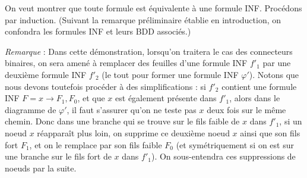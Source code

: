 \documentclass[a4paper,11pt]{article}
\begin{document}
		
		
		On veut montrer que toute formule est équivalente à une formule INF.
		Procédons par induction.
		(Suivant la remarque préliminaire établie en introduction, on confondra les formules INF et leurs BDD associés.)
		
		\emph{Remarque} :  Dans cette démonstration, lorsqu'on traitera le cas des connecteurs binaires, on sera amené à remplacer des feuilles d'une formule INF ${f'}_1$ par une deuxième formule INF ${f'}_2$ (le tout pour former une formule INF $\varphi'$).
		Notons que nous devons toutefois procéder à des simplifications : si ${f'}_2$ contient une formule INF $F = x \rightarrow F_1,F_0$, et que $x$ est également présente dans ${f'}_1$, alors dans le diagramme de $\varphi'$, il faut s'assurer qu'on ne teste pas $x$ deux fois sur le même chemin. Donc dans une branche qui se trouve sur le fils faible de $x$ dans ${f'}_1$, si un noeud $x$ réapparaît plus loin, on supprime ce deuxième noeud $x$ ainsi que son fils fort $F_1$, et on le remplace par son fils faible $F_0$ (et symétriquement si on est sur une branche sur le fils fort de $x$ dans ${f'}_1$). On sous-entendra ces suppressions de noeuds par la suite.
		
\end{document}
